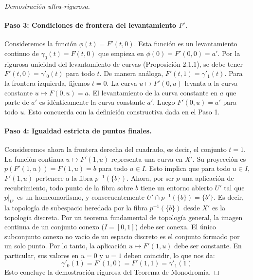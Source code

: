 \documentclass[11pt,a4paper]{article}
\theoremstyle{definition}
\theoremstyle{remark}
\numberwithin{equation}{section}
\begin{document}
\begin{proof}[Demostración ultra-rigurosa]
\begin{center}
\end{center}

\paragraph{Paso 3: Condiciones de frontera del levantamiento $F'$.} Consideremos la función $\phi(t) = F'(t,0)$. Esta función es un levantamiento continuo de $\gamma_0(t) = F(t,0)$ que empieza en $\phi(0) = F'(0,0) = a'$. Por la rigurosa unicidad del levantamiento de curvas (Proposición 2.1.1), se debe tener $F'(t,0) = \gamma'_0(t)$ para todo $t$. De manera análoga, $F'(t,1) = \gamma'_1(t)$. 
Para la frontera izquierda, fijemos $t=0$. La curva $u \mapsto F'(0,u)$ levanta a la curva constante $u \mapsto F(0,u) = a$. El levantamiento de la curva constante en $a$ que parte de $a'$ es idénticamente la curva constante $a'$. Luego $F'(0,u) = a'$ para todo $u$. Esto concuerda con la definición constructiva dada en el Paso 1.

\paragraph{Paso 4: Igualdad estricta de puntos finales.} Consideremos ahora la frontera derecha del cuadrado, es decir, el conjunto $t=1$. La función continua $u \mapsto F'(1,u)$ representa una curva en $X'$. Su proyección es $p(F'(1,u)) = F(1,u) = b$ para todo $u \in I$. Esto implica que para todo $u \in I$, $F'(1,u)$ pertenece a la fibra $p^{-1}(\{b\})$. 
Ahora, por ser $p$ una aplicación de recubrimiento, todo punto de la fibra sobre $b$ tiene un entorno abierto $U'$ tal que $p|_{U'}$ es un homeomorfismo, y consecuentemente $U' \cap p^{-1}(\{b\}) = \{b'\}$. Es decir, la topología de subespacio heredada por la fibra $p^{-1}(\{b\})$ desde $X'$ es la topología discreta. 
Por un teorema fundamental de topología general, la imagen continua de un conjunto conexo ($I = [0,1]$) debe ser conexa. El único subconjunto conexo no vacío de un espacio discreto es el conjunto formado por un solo punto. Por lo tanto, la aplicación $u \mapsto F'(1,u)$ debe ser constante. En particular, sus valores en $u=0$ y $u=1$ deben coincidir, lo que nos da:
$$ \gamma'_0(1) = F'(1,0) = F'(1,1) = \gamma'_1(1) $$
Esto concluye la demostración rigurosa del Teorema de Monodromía.
\end{proof}
\end{document}
